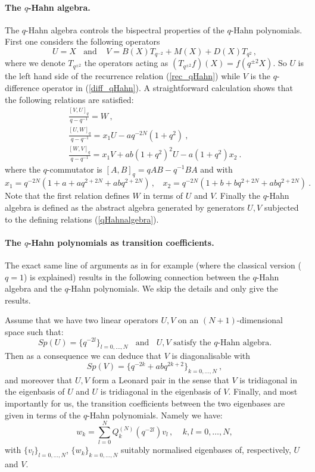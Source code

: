 \documentclass[a4paper,12pt]{article}
\numberwithin{equation}{section}
\theoremstyle{rem}
\theoremstyle{definition}
\begin{document}
\paragraph{The $q$-Hahn algebra.}The $q$-Hahn algebra controls the bispectral properties of the $q$-Hahn polynomials. First one considers the following operators
\[U=X\ \ \ \ \text{and}\ \ \ \ \ V=B(X)T_{q^{-2}}+M(X)+D(X)T_{q^2}\,,\]
where we denote $T_{q^{\pm2}}$ the operators acting as $(T_{q^{\pm2}}f)(X)=f(q^{\pm2}X)$. So $U$ is the left hand side of the recurrence relation (\ref{rec_qHahn}) while $V$ is the $q$-difference operator in (\ref{diff_qHahn}). A straightforward calculation shows that the following relations are satisfied:
\begin{equation}\label{qHahnalgebra}\begin{array}{l}
\displaystyle\frac{[V,U]_q}{q-q^{-1}}=W\,,\\[1em]
\displaystyle\frac{[U,W]_q}{q-q^{-1}}=x_1 U-aq^{-2N}(1+q^2)\ ,\\[1em]
\displaystyle\frac{[W,V]_q}{q-q^{-1}}=x_1 V+ab(1+q^2)^2 U-a(1+q^2)x_2\ .
\end{array}\end{equation}
where the $q$-commutator is $[A,B]_q=qAB-q^{-1}BA$ and with
\[x_1=q^{-2N}(1+a+aq^{2+2N}+abq^{2+2N})\,,\ \ \ \ x_2=q^{-2N}(1+b+bq^{2+2N}+abq^{2+2N})\ .\]
Note that the first relation defines $W$ in terms of $U$ and $V$. Finally the $q$-Hahn algebra is defined as the abstract algebra generated by generators $U,V$ subjected to the defining relations (\ref{qHahnalgebra}).

\paragraph{The $q$-Hahn polynomials as transition coefficients.} The exact same line of arguments as in \cite[\S 3]{LabrietPoulain23} for example (where the classical version ($q=1$) is explained) results in the following connection between the $q$-Hahn algebra and the $q$-Hahn polynomials. We skip the details and only give the results.

Assume that we have two linear operators $U,V$ on an $(N+1)$-dimensional space such that:
\[Sp(U)=\{q^{-2l}\}_{l=0,\dots,N}\ \ \ \ \text{and}\ \ \ \ \text{$U,V$ satisfy the $q$-Hahn algebra.}\]
Then as a consequence we can deduce that $V$ is diagonalisable with 
\[Sp(V)=\{q^{-2k}+abq^{2k+2}\}_{k=0,\dots,N}\ ,\]
and moreover that $U,V$ form a Leonard pair in the sense that $V$ is tridiagonal in the eigenbasis of $U$ and $U$ is tridiagonal in the eigenbasis of $V$. Finally, and most importantly for us, the transition coefficients between the two eigenbases are given in terms of the $q$-Hahn  polynomials. Namely we have:
\[w_k=\sum_{l=0}^N Q^{(N)}_{k}(q^{-2l}) v_l\,,\ \ \ \ \ k,l=0,\dots,N,\]
with $\{v_l\}_{l=0,\dots,N}$, $\{w_k\}_{k=0,\dots,N}$ suitably normalised eigenbases of, respectively, $U$ and $V$.
\end{document}
